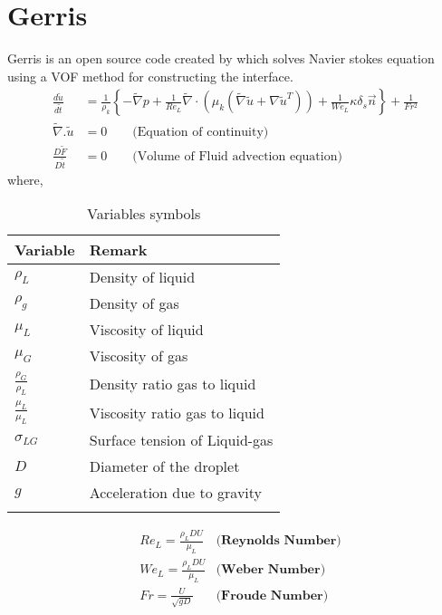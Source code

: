 \section{Gerris}
Gerris is an open source code created by \cite{Popinet2003} which solves Navier stokes equation using a VOF method for constructing the interface.
\begin{equation}
 \boxed {\begin{align}
 \frac{d \tilde u}{d\tilde t} &= \frac{1}{\rho_k} \left\{ - \tilde \nabla p + \frac{1}{Re_L}  \tilde \nabla \cdot ( \mu_k (\tilde \nabla \tilde u + \nabla \tilde u^T )) 
 + \frac{1}{We_L} \kappa \delta_s \overrightarrow n \right\} + \frac{1}{Fr^2} \\
 \tilde \nabla . \tilde u &= 0 \qquad\text{(Equation of continuity)}\\
 \frac{D\tilde F}{D\tilde t}&=0 \qquad\text{(Volume of Fluid advection equation)}
\end{align} }
\label{Eq:gerris_nd}
\end{equation}
where, 
 \begin{table}[H]
  \begin{center}
   \caption{Variables symbols}
 \label{variables}
    \begin{tabular}{ll}
      \toprule 
	  Variable & Remark   \\ 
	  \midrule
	  $\rho_L$ & Density of liquid  \\ 
	    $\rho_g$ & Density of gas \\
	    $\mu_L$ & Viscosity of liquid  \\
	    $\mu_G$ & Viscosity of gas \\
	     $\frac{\rho_G}{\rho_L}$ & Density ratio gas to liquid \\
	    $\frac{\mu_L}{\mu_L}$ & Viscosity ratio gas to liquid  \\
	    $\sigma_{LG}$ & Surface tension of Liquid-gas   \\
	    $D$ & Diameter of the droplet  \\
	    $g$ & Acceleration due to gravity \\
      \bottomrule \\
    \end{tabular}
  \end{center}
\end{table}
 
\begin{equation*}
\begin{align}
&Re_L = \frac{\rho_L D U}{\mu_L}  &\textbf{(Reynolds Number)}\\
&We_L = \frac{\rho_L D U}{\mu_L}  &\textbf{(Weber Number)}\\ 
&Fr = \frac{U}{\sqrt{gD}}  &\textbf{(Froude Number)}\\
\end{align}
\end{equation*}

